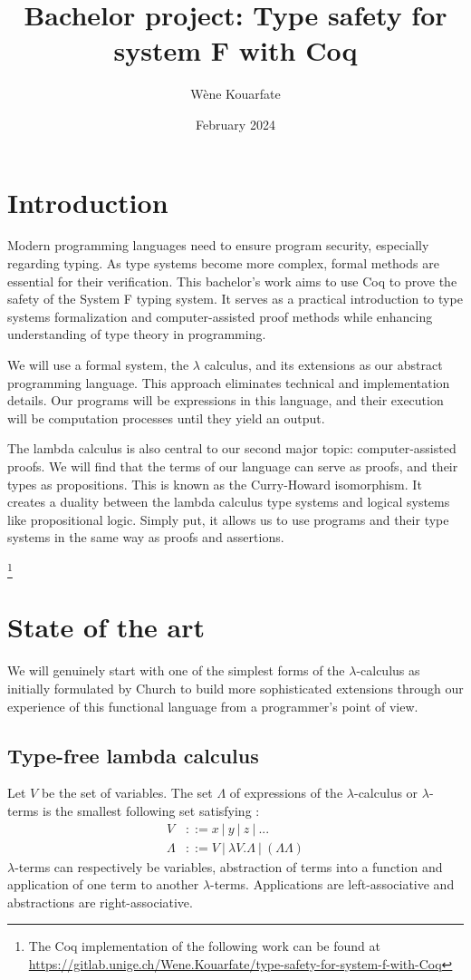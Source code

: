 \documentclass{article}
\title{Bachelor project: Type safety for system F with Coq}
\author{Wène Kouarfate}
\date{February 2024}
\begin{document}
\maketitle

\tableofcontents
\newpage

\section{Introduction}

Modern programming languages need to ensure program security, especially regarding typing. As type systems become more complex, formal methods are essential for their verification. This bachelor’s work aims to use Coq to prove the safety of the System F typing system. It serves as a practical introduction to type systems formalization and computer-assisted proof methods while enhancing understanding of type theory in programming.

We will use a formal system, the $\lambda$ calculus, and its extensions as our abstract programming language. This approach eliminates technical and implementation details. Our programs will be expressions in this language, and their execution will be computation processes until they yield an output.

The lambda calculus is also central to our second major topic: computer-assisted proofs. We will find that the terms of our language can serve as proofs, and their types as propositions. This is known as the Curry-Howard isomorphism. It creates a duality between the lambda calculus type systems and logical systems like propositional logic. Simply put, it allows us to use programs and their type systems in the same way as proofs and assertions.

\par
\footnote{The Coq implementation of the following work can be found at \url{https://gitlab.unige.ch/Wene.Kouarfate/type-safety-for-system-f-with-Coq}}

\section{State of the art}
We will genuinely start with one of the simplest forms of the $\lambda$-calculus as initially formulated by Church to build more sophisticated extensions through our experience of this functional language from a programmer's point of view.
\subsection{Type-free lambda calculus}
    Let $V$ be the set of variables. The set $\Lambda$ of expressions of the $\lambda$-calculus or $\lambda$-terms is the smallest following set  satisfying :
    \begin{align*}
        V &::= x \ | \ y \ | \ z \ | \ ... \\
        \Lambda &::= V \ | \ \lambda V.\Lambda \ | \ (\Lambda \Lambda)
    \end{align*}
    $\lambda$-terms can respectively be variables, abstraction of terms into a function and application of one term to another $\lambda$-terms. Applications are left-associative and abstractions are right-associative.
\end{document}
